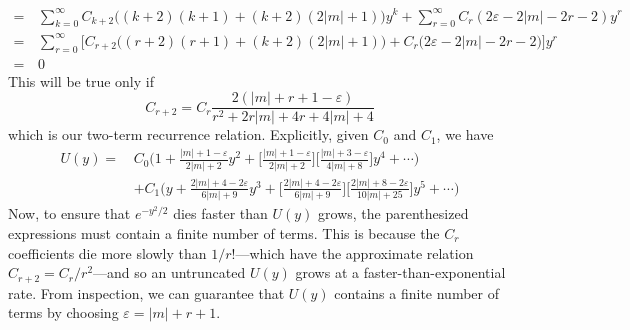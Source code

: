 \documentclass[../principles-of-quantum-mechanics.tex]{subfiles}
\begin{document}
\begin{questions}
\begin{solution}
\begin{align*}
			=\,&\sum_{k=0}^{\infty}C_{k+2}\big((k+2)(k+1) + (k+2)(2|m|+1)\big)y^k + \sum_{r=0}^{\infty}C_r(2\varepsilon - 2|m| - 2r - 2)y^r \\
			=\,&\sum_{r=0}^{\infty}\Big[C_{r+2}\Big((r+2)(r+1) + (k+2)(2|m| + 1)\Big) + C_r\Big(2\varepsilon - 2|m| - 2r - 2\Big)\Big]y^r \\
			=\,&0
		\end{align*}
		This will be true only if 
		$$C_{r+2} = C_r\frac{2(|m| + r + 1 - \varepsilon)}{r^2 + 2r|m| + 4r + 4|m| + 4}$$
		which is our two-term recurrence relation. Explicitly, given $C_0$ and $C_1$, we have
		\begin{align*}
			U(y) =\,&C_0\Big(1 + \frac{|m| + 1 - \varepsilon}{2|m| + 2}y^2 + \Big[\frac{|m| + 1 - \varepsilon}{2|m| + 2}\Big]\Big[\frac{|m| + 3 - \varepsilon}{4|m| + 8}\Big]y^4 + \cdots\Big) \\
			&+ C_1\Big(y + \frac{2|m| + 4 - 2\varepsilon}{6|m| + 9}y^3 + \Big[\frac{2|m| + 4 - 2\varepsilon}{6|m| + 9}\Big]\Big[\frac{2|m| + 8 - 2\varepsilon}{10|m| + 25}\Big]y^5 + \cdots\Big)
		\end{align*}
		Now, to ensure that $e^{-y^2/2}$ dies faster than $U(y)$ grows, the parenthesized expressions must contain a finite number of terms. This is because the $C_r$ coefficients die more slowly than $1/r!$---which have the approximate relation $C_{r+2} = C_r/r^2$---and so an untruncated $U(y)$ grows at a faster-than-exponential rate. From inspection, we can guarantee that $U(y)$ contains a finite number of terms by choosing $\varepsilon = |m| + r + 1$.


\end{solution}
\end{questions}
\end{document}
